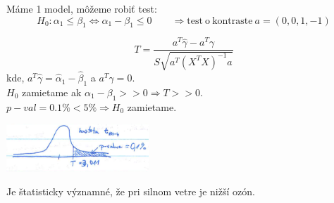 \documentclass[unknownkeysallowed]{article}
\begin{document}
\vspace{5mm}
Máme 1 model, môžeme robiť test:
$$H_0: \alpha_1 \leq \beta_1 \Leftrightarrow \alpha_1 - \beta_1 \leq 0 \qquad \Rightarrow \mathrm{test~o~kontraste~}a = (0,0,1,-1)$$

\begin{multicols}{2}

$$T = \frac{a^T\hat{\gamma} - a^T\gamma}{S\sqrt{a^T(X^TX)^{-1}a}}$$
kde, $a^T\hat{\gamma} = \hat{\alpha}_1 - \hat{\beta}_1$ a $a^T\gamma = 0$.\\
$H_0$ zamietame ak $\alpha_1 - \beta_1 >> 0 \Rightarrow T >> 0$.\\
$p-val = 0.1\% < 5\% \Rightarrow H_0$ zamietame.

\columnbreak

\includegraphics[width=0.4\textwidth]{imgs/obr40.png}

\end{multicols}

Je štatisticky významné, že pri silnom vetre je nižší ozón.
\end{document}
